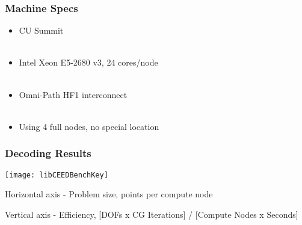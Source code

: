\documentclass{beamer}
\begin{document}

\begin{frame}
\begin{center}
\frametitle{Machine Specs}

\begin{itemize}

\item CU Summit\\

~\\

\item Intel Xeon E5-2680 v3, 24 cores/node\\

~\\

\item Omni-Path HF1 interconnect\\

~\\

\item Using 4 full nodes, no special location

\end{itemize}

\end{center}
\end{frame}


\begin{frame}
\begin{center}
\frametitle{Decoding Results}

\texttt{[image: libCEEDBenchKey]}

\vspace{-0.1cm}

\begin{itemize}

\footnotesize{

\item Horizontal axis - Problem size, points per compute node

\item Vertical axis - Efficiency, [DOFs x CG Iterations] / [Compute Nodes x
Seconds]

}

\end{itemize}

\end{center}
\end{frame}
\end{document}
